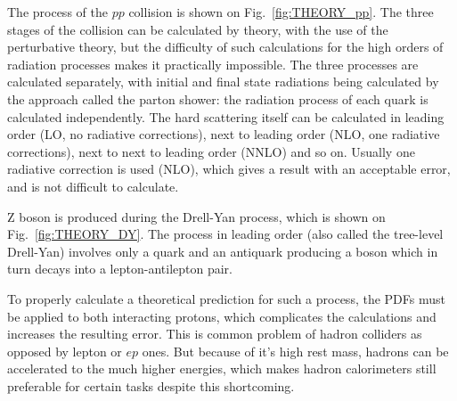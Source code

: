 The process of the $pp$ collision is shown on Fig.~\ref{fig:THEORY_pp}. The three stages of the collision can be calculated by theory, with the use of the perturbative theory, but the difficulty of such calculations for the high orders of radiation processes makes it practically impossible. The three processes are calculated separately, with initial and final state radiations being calculated by the approach called the parton shower: the radiation process of each quark is calculated independently. The hard scattering itself can be calculated in leading order (LO, no radiative corrections), next to leading order (NLO, one radiative corrections), next to next to leading order (NNLO) and so on. Usually one radiative correction is used (NLO), which gives a result with an acceptable error, and is not difficult to calculate.

\begin{figure}
\end{figure}

Z boson is produced during the Drell-Yan process, which is shown on Fig.~\ref{fig:THEORY_DY}. The process in leading order (also called the tree-level Drell-Yan) involves only a quark and an antiquark producing a boson which in turn decays into a lepton-antilepton pair.

To properly calculate a theoretical prediction for such a process, the PDFs must be applied to both interacting protons, which complicates the calculations and increases the resulting error. This is common problem of hadron colliders as opposed by lepton or $ep$ ones. But because of it's high rest mass, hadrons can be accelerated to the much higher energies, which makes hadron calorimeters still preferable for certain tasks despite this shortcoming.

